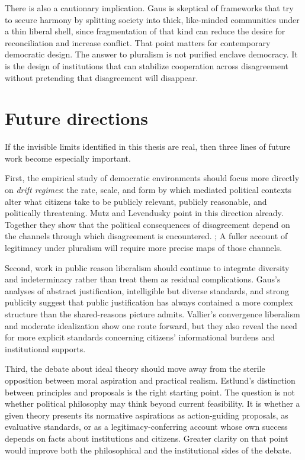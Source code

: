 \documentclass[12pt]{report}
\begin{document}
There is also a cautionary implication. Gaus is skeptical of frameworks that try to secure harmony by splitting society into thick, like-minded communities under a thin liberal shell, since fragmentation of that kind can reduce the desire for reconciliation and increase conflict. \parencite[pp.~206--207]{gaus2021open}
That point matters for contemporary democratic design. The answer to pluralism is not purified enclave democracy. It is the design of institutions that can stabilize cooperation across disagreement without pretending that disagreement will disappear.

\section{Future directions}

If the invisible limits identified in this thesis are real, then three lines of future work become especially important.

First, the empirical study of democratic environments should focus more directly on \emph{drift regimes}: the rate, scale, and form by which mediated political contexts alter what citizens take to be publicly relevant, publicly reasonable, and politically threatening. Mutz and Levendusky point in this direction already. Together they show that the political consequences of disagreement depend on the channels through which disagreement is encountered. \parencite[pp.~111--114]{mutz2002crosscutting}; \parencite[pp.~291--293]{levendusky2016media}
A fuller account of legitimacy under pluralism will require more precise maps of those channels.

Second, work in public reason liberalism should continue to integrate diversity and indeterminacy rather than treat them as residual complications. Gaus's analyses of abstract justification, intelligible but diverse standards, and strong publicity suggest that public justification has always contained a more complex structure than the shared-reasons picture admits. \parencite[pp.~42, 283, 297]{gaus2011order}
Vallier's convergence liberalism and moderate idealization show one route forward, but they also reveal the need for more explicit standards concerning citizens' informational burdens and institutional supports. \parencite[pp.~8, 255--257]{vallier2011diss}

Third, the debate about ideal theory should move away from the sterile opposition between moral aspiration and practical realism. Estlund's distinction between principles and proposals is the right starting point. \parencite[pp.~10--12]{estlund2019utopophobia}
The question is not whether political philosophy may think beyond current feasibility. It is whether a given theory presents its normative aspirations as action-guiding proposals, as evaluative standards, or as a legitimacy-conferring account whose own success depends on facts about institutions and citizens. Greater clarity on that point would improve both the philosophical and the institutional sides of the debate.
\end{document}
